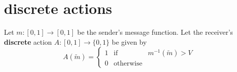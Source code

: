 \documentclass[12pt]{article}
\begin{document}
\section{discrete actions}

Let $m:[0,1]\rightarrow[0,1]$ be the sender's message function. Let the receiver's \textbf{discrete} action $A:[0,1]\rightarrow\{0,1\}$ be given by
\begin{equation*}
A(\tilde{m})=\left\{\begin{array}{ccc}
1 &\text{if}& m^{-1}(\tilde{m})>V\\
0 &\text{otherwise}&
\end{array}\right.
\end{equation*}
\end{document}
